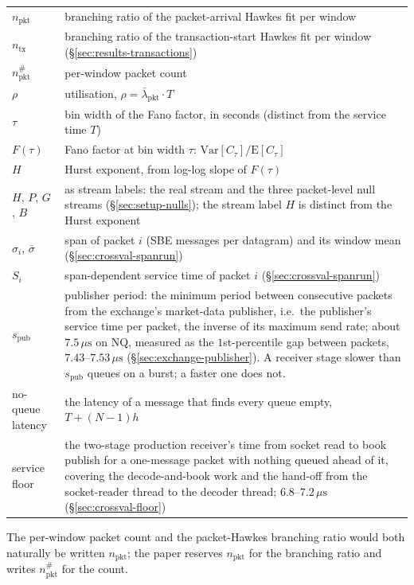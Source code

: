\documentclass[11pt]{article}
\newcommand{\spub}{s_{\mathrm{pub}}}
\begin{document}
\begin{center}
\begin{tabular}{@{}lp{}@{}}
$n_{\mathrm{pkt}}$ & branching ratio of the packet-arrival Hawkes fit per window \\
$n_{\mathrm{tx}}$ & branching ratio of the transaction-start Hawkes fit per window (\S\ref{sec:results-transactions}) \\
$n_{\mathrm{pkt}}^{\#}$ & per-window packet count \\
$\rho$ & utilisation, $\rho = \bar\lambda_{\mathrm{pkt}} \cdot T$ \\
$\tau$ & bin width of the Fano factor, in seconds (distinct from the service time $T$) \\
$F(\tau)$ & Fano factor at bin width $\tau$: $\mathrm{Var}[C_\tau] / \mathrm{E}[C_\tau]$ \\
$H$ & Hurst exponent, from log-log slope of $F(\tau)$ \\
$H$, $P$, $G$, $B$ & as stream labels: the real stream and the three packet-level null streams (\S\ref{sec:setup-nulls}); the stream label $H$ is distinct from the Hurst exponent \\
$\sigma_i$, $\bar\sigma$ & span of packet $i$ (SBE messages per datagram) and its window mean (\S\ref{sec:crossval-spanrun}) \\
$S_i$ & span-dependent service time of packet $i$ (\S\ref{sec:crossval-spanrun}) \\
\midrule
$\spub$ & publisher period: the minimum period between consecutive packets from the exchange's market-data publisher, i.e.\ the publisher's service time per packet, the inverse of its maximum send rate; about $7.5\,\mu\mathrm{s}$ on NQ, measured as the $1$st-percentile gap between packets, $7.43$--$7.53\,\mu\mathrm{s}$ (\S\ref{sec:exchange-publisher}). A receiver stage slower than $\spub$ queues on a burst; a faster one does not. \\
no-queue latency & the latency of a message that finds every queue empty, $T + (N-1)h$ \\
service floor & the two-stage production receiver's time from socket read to book publish for a one-message packet with nothing queued ahead of it, covering the decode-and-book work and the hand-off from the socket-reader thread to the decoder thread; $6.8$--$7.2\,\mu\mathrm{s}$ (\S\ref{sec:crossval-floor}) \\
\bottomrule
\end{tabular}
\end{center}

The per-window
packet count and the packet-Hawkes branching ratio would both naturally be written
$n_{\mathrm{pkt}}$; the paper reserves $n_{\mathrm{pkt}}$ for the branching ratio and
writes $n_{\mathrm{pkt}}^{\#}$ for the count.
\end{document}
